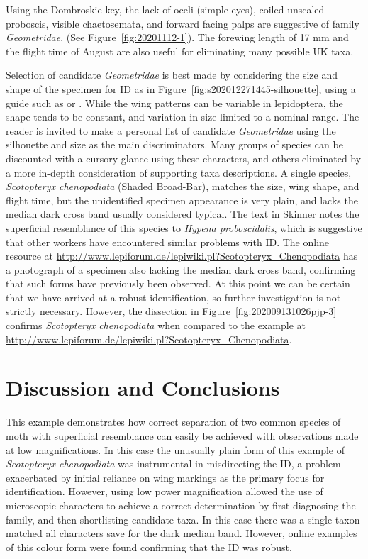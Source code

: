 \documentclass[]{article}
\begin{document}
Using the Dombroskie key, the lack of oceli (simple eyes), coiled unscaled proboscis, visible chaetosemata, and forward facing palps are suggestive of family \textit{Geometridae}. (See Figure~\ref{fig:20201112-1}). The forewing length of 17 mm and the flight time of August are also useful for eliminating many possible UK taxa.

Selection of candidate \textit{Geometridae} is best made by considering the size and shape of the specimen for ID as in Figure~\ref{fig:s202012271445-silhouette}, using  a guide such as \cite{Skinner1984} or \cite{Waring2018}.  While the wing patterns can be variable in lepidoptera, the shape tends to be constant, and variation in size limited to a nominal range.  The reader is invited to make a personal list of candidate \textit{Geometridae} using the silhouette and size as the main discriminators.  Many groups of species can be discounted with a cursory glance using these characters, and others eliminated by a more in-depth consideration of supporting taxa descriptions.
A single species, \textit{Scotopteryx chenopodiata} (Shaded Broad-Bar),  matches the size,  wing shape, and flight time,  but the unidentified specimen appearance is very plain,  and lacks the median dark cross band usually considered typical. The text in Skinner notes the superficial resemblance of this species to \textit{Hypena proboscidalis}, which is suggestive that other workers have encountered similar problems with ID. The online resource at \url{http://www.lepiforum.de/lepiwiki.pl?Scotopteryx_Chenopodiata} has a photograph of a specimen also lacking the median dark cross band, confirming that such forms have previously been observed. At this point we can be certain that we have arrived at a robust identification, so further investigation is not strictly necessary. However, 
the dissection in Figure~\ref{fig:202009131026pjp-3}  confirms \textit{Scotopteryx chenopodiata} when compared to the example at \url{http://www.lepiforum.de/lepiwiki.pl?Scotopteryx_Chenopodiata}.

\section*{Discussion and Conclusions}
This example demonstrates how correct separation of two common species of moth with superficial resemblance can easily be achieved with observations made at low magnifications. In this case the unusually plain form of this example of \textit{Scotopteryx chenopodiata} was instrumental in misdirecting the ID, a problem exacerbated by initial reliance on wing markings as the primary focus for identification. However, using low power magnification allowed the use of microscopic characters to achieve a correct determination by first diagnosing the family, and then shortlisting candidate taxa. In this case there was a single taxon  matched all characters save for the dark median band. However, online examples of this colour form were found confirming that the ID was robust.
\end{document}
